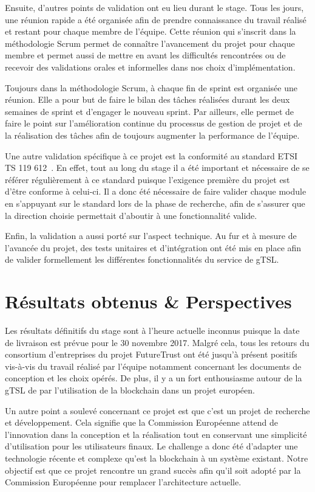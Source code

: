 \documentclass{tnreport}
\begin{document}
Ensuite, d'autres points de validation ont eu lieu durant le stage. Tous les jours, une réunion rapide a été organisée afin de prendre connaissance du travail réalisé et restant pour chaque membre de l'équipe. Cette réunion qui s'inscrit dans la méthodologie Scrum permet de connaître l'avancement du projet pour chaque membre et permet aussi de mettre en avant les difficultés rencontrées ou de recevoir des validations orales et informelles dans nos choix d'implémentation. 

Toujours dans la méthodologie Scrum, à chaque fin de sprint est organisée une réunion. Elle a pour but de faire le bilan des tâches réalisées durant les deux semaines de sprint et d'engager le nouveau sprint. Par ailleurs, elle permet de faire le point sur l'amélioration continue du processus de gestion de projet et de la réalisation des tâches afin de toujours augmenter la performance de l'équipe. 

Une autre validation spécifique à ce projet est la conformité au standard ETSI TS 119 612~\cite{ETSITS119612}. En effet, tout au long du stage il a été important et nécessaire de se référer régulièrement à ce standard puisque l'exigence première du projet est d'être conforme à celui-ci. Il a donc été nécessaire de faire valider chaque module en s'appuyant sur le standard lors de la phase de recherche, afin de s'assurer que la direction choisie permettait d'aboutir à une fonctionnalité valide.

Enfin, la validation a aussi porté sur l'aspect technique. Au fur et à mesure de l'avancée du projet, des tests unitaires et d'intégration ont été mis en place afin de valider formellement les différentes fonctionnalités du service de gTSL.

\chapter{Résultats obtenus \& Perspectives}

Les résultats définitifs du stage sont à l'heure actuelle inconnus puisque la date de livraison est prévue pour le 30 novembre 2017. Malgré cela, tous les retours du consortium d'entreprises du projet FutureTrust ont été jusqu'à présent positifs vis-à-vis du travail réalisé par l'équipe notamment concernant les documents de conception et les choix opérés. De plus, il y a un fort enthousiasme autour de la gTSL de par l'utilisation de la blockchain dans un projet européen.

Un autre point a soulevé concernant ce projet est que c'est un projet de recherche et développement. Cela signifie que la Commission Européenne attend de l'innovation dans la conception et la réalisation tout en conservant une simplicité d'utilisation pour les utilisateurs finaux. Le challenge a donc été d'adapter une technologie récente et complexe qu'est la blockchain à un système existant. Notre objectif est que ce projet rencontre un grand succès afin qu'il soit adopté par la Commission Européenne pour remplacer l'architecture actuelle.
\end{document}
